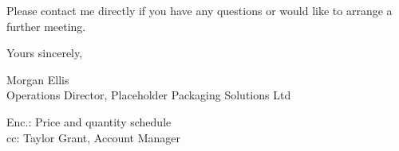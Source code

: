 \documentclass[11pt]{article}
\newcommand{\sendername}{Morgan Ellis}
\newcommand{\senderrole}{Operations Director}
\newcommand{\sendercompany}{Placeholder Packaging Solutions Ltd}
\begin{document}
Please contact me directly if you have any questions or would like to arrange a further meeting.

Yours sincerely,

\vspace{0.5em}

\sendername\\
\senderrole, \sendercompany

\vspace{1em}
{\small
Enc.: Price and quantity schedule\\
cc: Taylor Grant, Account Manager}
\end{document}
